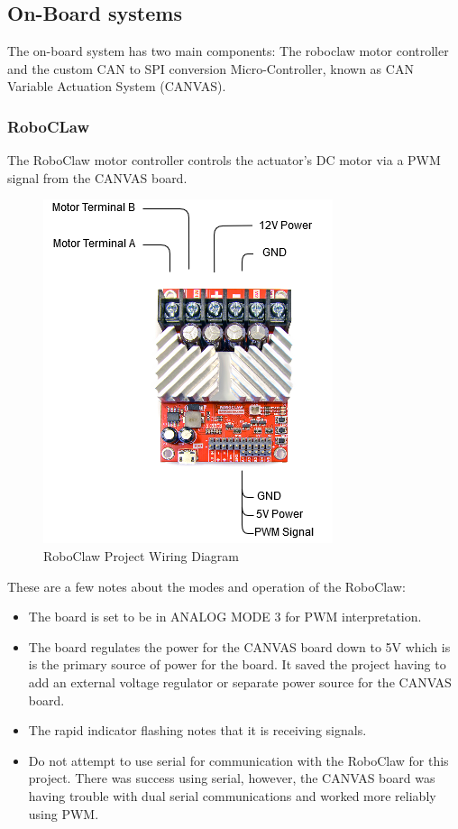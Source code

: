 \documentclass{article}
\begin{document}
\subsection{On-Board systems}
The on-board system has two main components: The roboclaw motor controller and the custom CAN to SPI conversion Micro-Controller, known as CAN Variable Actuation System (CANVAS).

\subsubsection{RoboCLaw}
The RoboClaw motor controller controls the actuator's DC motor via a PWM signal from the CANVAS board. 
\newline 
\begin{figure}[h!]
\centering
\includegraphics[scale=0.7]{ME_490_Drawings.png}
\caption{RoboClaw Project Wiring Diagram}
\label{fig:roboclaw}
\end{figure}

These are a few notes about the modes and operation of the RoboClaw:
\begin{itemize}
    \item The board is set to be in ANALOG MODE 3 for PWM interpretation.
    \item The board regulates the power for the CANVAS board down to 5V which is is the primary source of power for the board. It saved the project having to add an external voltage regulator or separate power source for the CANVAS board.
    \item The rapid indicator flashing notes that it is receiving signals.
    \item Do not attempt to use serial for communication with the RoboClaw for this project. There was success using serial, however, the CANVAS board was having trouble with dual serial communications and worked more reliably using PWM.
\end{itemize}
\end{document}
